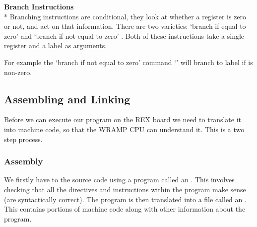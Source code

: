 \textbf{Branch Instructions}\\*
Branching instructions are conditional, they look at whether a
register is zero or not, and act on that information.  There are two
varieties: `branch if equal to zero'  and `branch if not
equal to zero' .  Both of these instructions take a single
register and a label as arguments.

For example the `branch if not equal to zero' command 
`' will branch to label 
 if  is non-zero.

\begin{comment}
\subsection{I/O Routines}

In the example program you will see we have used the routines
\src{putstr}, \src{readnum} and \src{writenum} to perfrom input
and output.  These routines are in the file \LIBEXTWO, which we will 
\BI{link} to.  Here is an overview of the routines:
\begin{description}
\item[\src{putstr}] is used to write a string to the Linux machine.  Put the
address of the string into register \reg{2}.
\item[\src{readnum}] reads a number from the Linux machine, leaving it in
register \reg{1}.
\item[\src{writenum}] will write the number in register \reg{2} to the 
Linux machine.
\end{description}
\end{comment}

\subsection{Assembling and Linking}
Before we can execute our program on the REX board we need to translate it 
into machine code, so that the WRAMP CPU can understand it.  This is a two
step process.

\subsubsection{Assembly}
We firstly have to  the source code using a program
called an .  This involves checking that all the
directives and instructions within the program make sense (are
syntactically correct).  The program is then translated into a file
called an . This contains portions of machine code
along with other information about the program.

